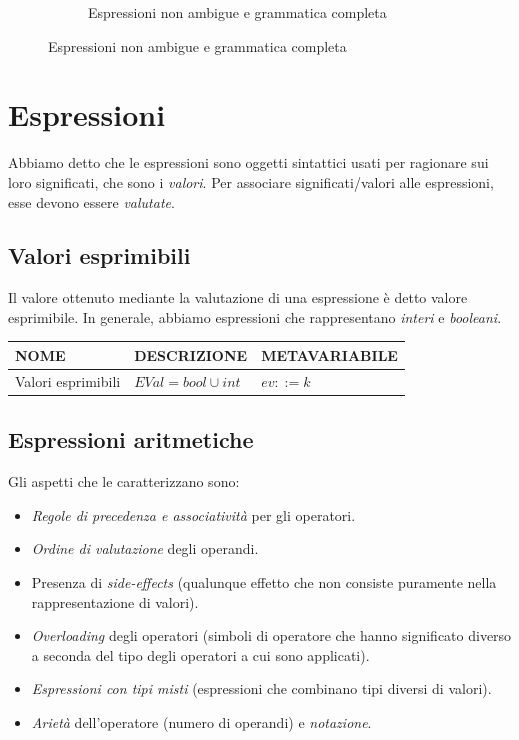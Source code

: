 \documentclass[a4paper,oneside,titlepage]{book}
\begin{document}
\begin{figure}[htp]
\begin{subfigure}{0.49\textwidth}
		\caption{Espressioni non ambigue e grammatica completa}
	\end{subfigure}
\end{figure}


\chapter{Espressioni}
Abbiamo detto che le espressioni sono oggetti sintattici usati per ragionare sui loro significati, che sono i \textit{valori}. Per associare significati/valori alle espressioni, esse devono essere \textit{valutate}.

\section{Valori esprimibili}
Il valore ottenuto mediante la valutazione di una espressione è detto valore esprimibile. In generale, abbiamo espressioni che rappresentano \textit{interi} e \textit{booleani}.

\noindent
\begin{center}
	\begin{tabular}{lll}
	\toprule
	\textbf{NOME} & \textbf{DESCRIZIONE} & \textbf{METAVARIABILE} \\
	\midrule
	Valori esprimibili & $EVal = bool \cup int$ & $ev ::= k$ \\
	\bottomrule
\end{tabular}
\end{center}

\section{Espressioni aritmetiche}
Gli aspetti che le caratterizzano sono:
\begin{itemize}
	\item \textit{Regole di precedenza e associatività} per gli operatori.
	\item \textit{Ordine di valutazione} degli operandi.
	\item Presenza di \textit{side-effects} (qualunque effetto che non consiste puramente nella rappresentazione di valori).
	\item \textit{Overloading} degli operatori (simboli di operatore che hanno significato diverso a seconda del tipo degli operatori a cui sono applicati).
	\item \textit{Espressioni con tipi misti} (espressioni che combinano tipi diversi di valori).
	\item \textit{Arietà} dell'operatore (numero di operandi) e \textit{notazione}.
\end{itemize}
\end{document}
